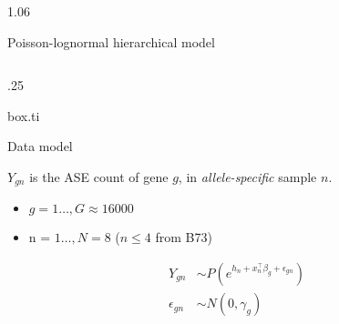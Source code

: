 \documentclass[final]{beamer}
\newlength{\twocolwid}
\newlength{\threecolwid}
\begin{document}
\begin{frame}
\begin{columns}[t,totalwidth=\threecolwid]
\begin{column}{1.06\twocolwid}
\begin{alertblock}{Poisson-lognormal hierarchical model}
\begin{columns}[t, totalwidth = \twocolwid]
\begin{column}{.25\twocolwid}
\begin{beamercolorbox}{box.ti}
\vspace{.1cm}

Data model
\vspace{.1cm}
\end{beamercolorbox}

$Y_{gn}$ is the ASE count of gene $g$, in \textit{allele-specific} sample $n$.  
\begin{itemize}
\item $g=1\ldots,G \approx 16000$
\item n = $1\ldots,N=8$ ($n \leq 4$ from B73)
\end{itemize}

\begin{equation}\label{model}
\begin{array}{ll}
Y_{gn} & \sim P(e^{h_{n} + x_{n}^{\top} \beta_g + \epsilon_{gn} })  \\ 
\epsilon_{gn} & \sim  N(0, \gamma_g)
\end{array} 
\end{equation}


\end{column}
\end{columns}
\end{alertblock}
\end{column}
\end{columns}
\end{frame}
\end{document}

